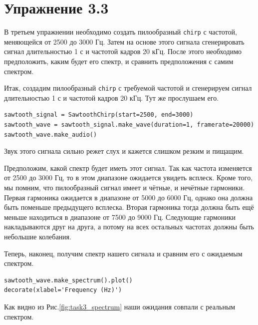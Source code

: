 \documentclass[a4paper, 14pt]{extarticle}
\begin{document}
    \newpage

    \section{Упражнение 3.3}
    \label{sec:task3}

    В третьем упражнении необходимо создать пилообразный \texttt{chirp} с частотой, меняющейся от 2500 до 3000 Гц.
    Затем на основе этого сигнала сгенерировать сигнал длительностью 1 с и частотой кадров 20 кГц. После этого необходимо
    предположить, каким будет его спектр, и сравнить предположения с самим спектром.

    Итак, создадим пилообразный \texttt{chirp} с требуемой частотой и сгенерируем сигнал длительностью 1 с и частотой кадров 20 кГц.
    Тут же прослушаем его.

    \begin{lstlisting}[caption= {Создание сигнала, получение \texttt{wave} и аудио.}, label={lst:task3_wave_audio}]
sawtooth_signal = SawtoothChirp(start=2500, end=3000)
sawtooth_wave = sawtooth_signal.make_wave(duration=1, framerate=20000)
sawtooth_wave.make_audio()
    \end{lstlisting}

    Звук этого сигнала сильно режет слух и кажется слишком резким и пищащим.

    Предположим, какой спектр будет иметь этот сигнал. Так как частота изменяется от 2500 до 3000 Гц, то в этом диапазоне
    ожидается увидеть всплеск. Кроме того, мы помним, что пилообразный сигнал имеет и чётные, и нечётные гармоники.
    Первая гармоника ожидается в диапазоне от 5000 до 6000 Гц, однако она должна быть поменьше предыдущего всплеска.
    Вторая гармоника тогда должна быть ещё меньше находиться в диапазоне от 7500 до 9000 Гц. Следующие гармоники
    накладываются друг на друга, а потому на всех остальных частотах должны быть небольшие колебания.

    Теперь, наконец, получим спектр нашего сигнала и сравним его с ожидаемым спектром.

    \begin{lstlisting}[caption= Создание и вывод спектра., label={lst:task3_spectrum}]
sawtooth_wave.make_spectrum().plot()
decorate(xlabel='Frequency (Hz)')
    \end{lstlisting}

    Как видно из Рис.\ref{fig:task3_spectrum} наши ожидания совпали с реальным спектром.
\end{document}
